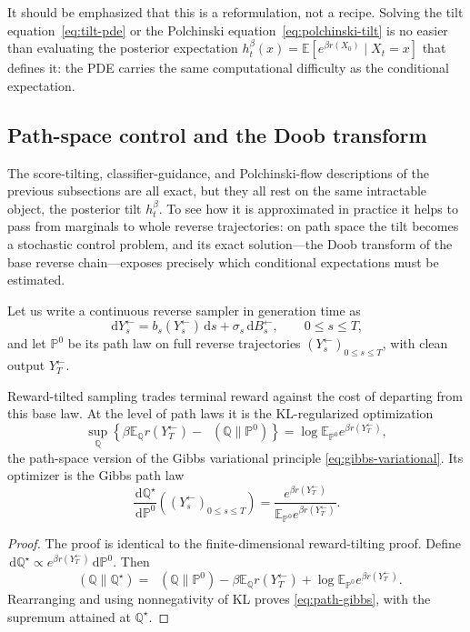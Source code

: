 \documentclass{amsart}
\numberwithin{equation}{section}
\theoremstyle{plain}
\theoremstyle{definition}
\theoremstyle{remark}
\DeclareMathOperator{\KL}{D_{\mathsf{KL}}}
\newcommand{\E}{\mathbb{E}}
\newcommand{\Pp}{\mathbb{P}}
\newcommand{\dd}{\,\mathrm{d}}
\begin{document}
It should be emphasized that this is a reformulation, not a recipe.  Solving the
tilt equation~\eqref{eq:tilt-pde} or the Polchinski
equation~\eqref{eq:polchinski-tilt} is no easier than evaluating the posterior
expectation $h_t^\beta(x)=\E[e^{\beta r(X_0)}\mid X_t=x]$ that defines it: the PDE
carries the same computational difficulty as the conditional expectation.

\subsection{Path-space control and the Doob transform}

The score-tilting, classifier-guidance, and Polchinski-flow descriptions of the
previous subsections are all exact, but they all rest on the same intractable
object, the posterior tilt $h_t^\beta$.  To see how it is approximated in
practice it helps to pass from marginals to whole reverse trajectories: on path
space the tilt becomes a stochastic control problem, and its exact
solution---the Doob transform of the base reverse chain---exposes precisely which
conditional expectations must be estimated.

Let us write a continuous reverse sampler in generation time as
\[
    \dd Y^{\leftarrow}_s=b_s(Y^{\leftarrow}_s)\dd s+\sigma_s\dd B^{\leftarrow}_s,
    \qquad 0\leq s\leq T,
\]
and let $\Pp^0$ be its path law on full reverse trajectories
$(Y^{\leftarrow}_s)_{0\leq s\leq T}$, with clean output $Y^{\leftarrow}_T$.

Reward-tilted sampling trades terminal reward against the cost of departing from
this base law.  At the level of path laws it is the KL-regularized optimization
\begin{equation}\label{eq:path-gibbs}
    \sup_{\mathbb Q}
    \left\{
    \beta\E_{\mathbb Q}r(Y^{\leftarrow}_T)-\KL(\mathbb Q\|\Pp^0)
    \right\}
    =
    \log\E_{\Pp^0}e^{\beta r(Y^{\leftarrow}_T)},
\end{equation}
the path-space version of the Gibbs variational principle
\eqref{eq:gibbs-variational}.  Its optimizer is the Gibbs path law
\begin{equation}\label{eq:path-gibbs-optimizer}
    \frac{\dd\mathbb Q^\star}{\dd\Pp^0}
    \!\left((Y^{\leftarrow}_s)_{0\leq s\leq T}\right)
    =
    \frac{e^{\beta r(Y^{\leftarrow}_T)}}
    {\E_{\Pp^0}e^{\beta r(Y^{\leftarrow}_T)}}.
\end{equation}

\begin{proof}
The proof is identical to the finite-dimensional reward-tilting proof.  Define
$\dd\mathbb Q^\star\propto e^{\beta r(Y^{\leftarrow}_T)}\dd\Pp^0$.  Then
\[
    \KL(\mathbb Q\|\mathbb Q^\star)
    =
    \KL(\mathbb Q\|\Pp^0)-\beta \E_{\mathbb Q}r(Y^{\leftarrow}_T)
    +\log\E_{\Pp^0}e^{\beta r(Y^{\leftarrow}_T)}.
\]
Rearranging and using nonnegativity of KL proves \eqref{eq:path-gibbs}, with the
supremum attained at $\mathbb Q^\star$.
\end{proof}
\end{document}
